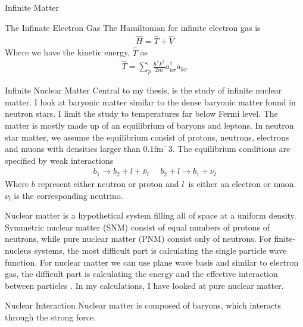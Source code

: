 \documentclass[twoside,english]{uiofysmaster}
\begin{document}
\begin{chapter}{Infinite Matter}
\begin{section}{The Infinate Electron Gas}
		 The Hamiltonian for infinite electron gas is
		 \begin{align}
		 	\hat H = \hat T + \hat V
		 \end{align}
		 Where we have the kinetic energy, $\hat T$ as
		 \begin{align}
		 	\hat T = \sum_p \frac{\hbar ^2 k^2}{2m} a_{k \sigma}^{\dagger} a_{k \sigma}
		 \end{align}

	\end{section}
	\begin{section}{Infinite Nuclear Matter}
		Central to my thesis, is the study of infinite nuclear matter. I look at baryonic matter similar to the dense baryonic matter found in neutron stars. I limit the study to temperatures far below Fermi level. The matter is mostly made up of an equilibrium of baryons and leptons. In neutron star matter, we assume the equilibrium consist of protons, neutrons, electrons and muons with densities larger than $0.1 \text{fm}^-3$. The equilibrium conditions are specified by weak interactions
		\begin{align}
		 	b_1 \rightarrow b_2 + l + \bar \nu_l \:\:\:\:\:\: b_2 + l \rightarrow b_1 + \nu_l
		\end{align} 
		Where $b$ represent either neutron or proton and $l$ is either an electron or muon. $\nu_l$ is the corresponding neutrino. 

		Nuclear matter is a hypothetical system filling all of space at a uniform density. Symmetric nuclear matter (SNM) consist of equal numbers of protons of neutrons, while pure nuclear matter (PNM) consist only of neutrons. For finite-nucleus systems, the most difficult part is calculating the single particle wave function. For nuclear matter we can use plane wave basis and similar to electron gas, the difficult part is calculating the energy and the effective interaction between particles \cite{Day1967}. In my calculations, I have looked at pure nuclear matter. 


	\end{section}
	\begin{section}{Nuclear Interaction}
		Nuclear matter is composed of baryons, which interacts through the strong force. 
		

\end{section}
\end{chapter}
\end{document}
